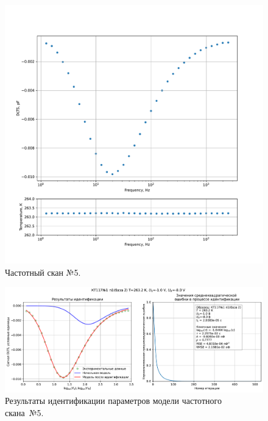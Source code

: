 \begin{figure}[!ht]
    \centering
    \includegraphics[width=1\textwidth]{../plots/КТ117№1_п1(база 2)_2500Гц-1Гц_1пФ_-10С_-1В-8В_200мВ_20мкс_шаг_0,1.pdf}
    \caption{Частотный скан №5.}
    \label{pic:frequency_scan_5}
\end{figure}

\begin{figure}[!ht]
    \centering
    \includegraphics[width=1\textwidth]{../plots/КТ117№1_п1(база 2)_2500Гц-1Гц_1пФ_-10С_-1В-8В_200мВ_20мкс_шаг_0,1_model.pdf}
    \caption{Результаты идентификации параметров модели частотного скана~№5.}
    \label{pic:frequency_scan_model5}
\end{figure}

\pagebreak


